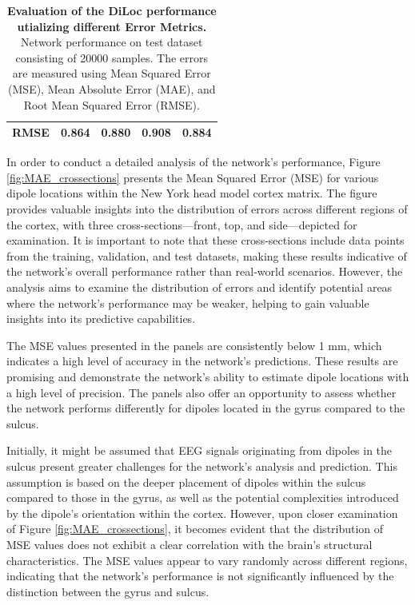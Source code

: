 \documentclass[a4paper, UKenglish, 11pt]{uiomaster}
\begin{document}
\begin{table}[!htb]
\begin{tabular}{l|cccc|}
\multicolumn{1}{|l|}{\cellcolor[HTML]{EFEFEF}RMSE} & \multicolumn{1}{c|}{0.864}                                                                                  & \multicolumn{1}{c|}{0.880}                                                                                   & \multicolumn{1}{c|}{0.908}                                                                                   & 0.884                                                                                                              \\ \hline
\end{tabular}
\caption{\textbf{Evaluation of the DiLoc performance utializing different Error Metrics.} \newline
Network performance on test dataset consisting of 20000 samples. The errors are measured using Mean Squared Error (MSE), Mean Absolute Error (MAE), and Root Mean Squared Error (RMSE).}
\label{table:error_simple_dipole}
\end{table}


In order to conduct a detailed analysis of the network's performance, Figure \ref{fig:MAE_crossections} presents the Mean Squared Error (MSE) for various dipole locations within the New York head model cortex matrix. The figure provides valuable insights into the distribution of errors across different regions of the cortex, with three cross-sections—front, top, and side—depicted for examination. It is important to note that these cross-sections include data points from the training, validation, and test datasets, making these results indicative of the network's overall performance rather than real-world scenarios. However, the analysis aims to examine the distribution of errors and identify potential areas where the network's performance may be weaker, helping to gain valuable insights into its predictive capabilities.

The MSE values presented in the panels are consistently below 1 mm, which indicates a high level of accuracy in the network's predictions. These results are promising and demonstrate the network's ability to estimate dipole locations with a high level of precision. The panels also offer an opportunity to assess whether the network performs differently for dipoles located in the gyrus compared to the sulcus.

Initially, it might be assumed that EEG signals originating from dipoles in the sulcus present greater challenges for the network's analysis and prediction. This assumption is based on the deeper placement of dipoles within the sulcus compared to those in the gyrus, as well as the potential complexities introduced by the dipole's orientation within the cortex. However, upon closer examination of Figure \ref{fig:MAE_crossections}, it becomes evident that the distribution of MSE values does not exhibit a clear correlation with the brain's structural characteristics. The MSE values appear to vary randomly across different regions, indicating that the network's performance is not significantly influenced by the distinction between the gyrus and sulcus.
\end{document}
